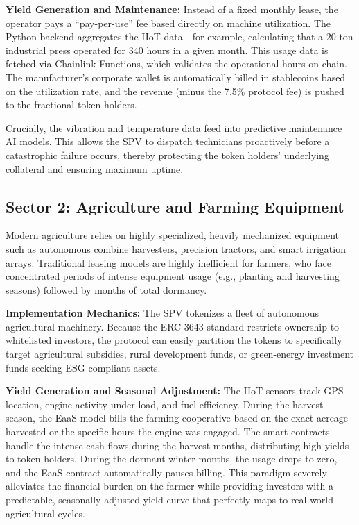 \documentclass[12pt, a4paper]{article}
\begin{document}
\textbf{Yield Generation and Maintenance:}
Instead of a fixed monthly lease, the operator pays a ``pay-per-use'' fee based directly on machine utilization. The Python backend aggregates the IIoT data—for example, calculating that a 20-ton industrial press operated for 340 hours in a given month. This usage data is fetched via Chainlink Functions, which validates the operational hours on-chain. The manufacturer's corporate wallet is automatically billed in stablecoins based on the utilization rate, and the revenue (minus the 7.5\% protocol fee) is pushed to the fractional token holders.

Crucially, the vibration and temperature data feed into predictive maintenance AI models. This allows the SPV to dispatch technicians proactively before a catastrophic failure occurs, thereby protecting the token holders' underlying collateral and ensuring maximum uptime.

\subsection{Sector 2: Agriculture and Farming Equipment}
Modern agriculture relies on highly specialized, heavily mechanized equipment such as autonomous combine harvesters, precision tractors, and smart irrigation arrays. Traditional leasing models are highly inefficient for farmers, who face concentrated periods of intense equipment usage (e.g., planting and harvesting seasons) followed by months of total dormancy.

\textbf{Implementation Mechanics:}
The SPV tokenizes a fleet of autonomous agricultural machinery. Because the ERC-3643 standard restricts ownership to whitelisted investors, the protocol can easily partition the tokens to specifically target agricultural subsidies, rural development funds, or green-energy investment funds seeking ESG-compliant assets.

\textbf{Yield Generation and Seasonal Adjustment:}
The IIoT sensors track GPS location, engine activity under load, and fuel efficiency. During the harvest season, the EaaS model bills the farming cooperative based on the exact acreage harvested or the specific hours the engine was engaged. The smart contracts handle the intense cash flows during the harvest months, distributing high yields to token holders. During the dormant winter months, the usage drops to zero, and the EaaS contract automatically pauses billing. This paradigm severely alleviates the financial burden on the farmer while providing investors with a predictable, seasonally-adjusted yield curve that perfectly maps to real-world agricultural cycles.
\end{document}
